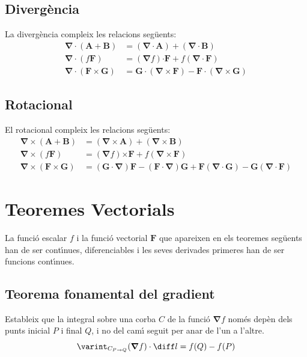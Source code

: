 \documentclass[catalan,a4paper,twoside,11pt]{article}
\begin{document}
\subsection{Diverg\`{e}ncia}
La diverg\`{e}ncia compleix les relacions seg\"{u}ents:
\begin{align}
    \boldsymbol{\nabla\cdot}(\boldsymbol{A}+\boldsymbol{B}) &= (\boldsymbol{\nabla\cdot A}) +
    (\boldsymbol{\nabla\cdot B})\\
    \boldsymbol{\nabla\cdot}(f\boldsymbol{F}) &=
    (\boldsymbol{\nabla}f)\boldsymbol{\cdot F} + f(\boldsymbol{\nabla\cdot F})\\
       \boldsymbol{\nabla\cdot}(\boldsymbol{F\times G}) &=
    \boldsymbol{G\cdot}(\boldsymbol{\nabla\times F}) -
    \boldsymbol{F\cdot}(\boldsymbol{\nabla\times G})
\end{align}

\subsection{Rotacional}
El rotacional compleix les relacions seg\"{u}ents:
\begin{align}
    \boldsymbol{\nabla\times}(\boldsymbol{A}+\boldsymbol{B}) &= (\boldsymbol{\nabla\times A}) + (\boldsymbol{\nabla\times B})\\
    \boldsymbol{\nabla\times}(f\boldsymbol{F}) &=
    (\boldsymbol{\nabla}f)\boldsymbol{\times F} + f(\boldsymbol{\nabla\times F})\\
    \boldsymbol{\nabla\times}(\boldsymbol{F\times G}) &= (\boldsymbol{G\cdot\nabla})\boldsymbol{F} - (\boldsymbol{F\cdot\nabla})\boldsymbol{G} + \boldsymbol{F}(\boldsymbol{\nabla\cdot G}) - \boldsymbol{G}(\boldsymbol{\nabla\cdot F})
\end{align}


\section{Teoremes Vectorials}

La funci\'{o} escalar $f$ i la funci\'{o} vectorial $\boldsymbol{F}$ que apareixen en els teoremes seg\"{u}ents han de ser cont\'{\i}nues, diferenciables i les seves derivades primeres han de ser funcions cont\'{\i}nues.

\subsection{Teorema fonamental del gradient}
Estableix que la integral sobre una corba $C$ de la funci\'{o} $\boldsymbol{\nabla} f$ nom\'{e}s dep\`{e}n dels punts inicial $P$ i final $Q$, i no del cam\'{\i} seguit per anar de l'un a l'altre.
\begin{equation}
    \varint_{C_{P\rightarrow Q}} (\boldsymbol{\nabla}f) \cdot \diff l = f(Q)-f(P)
\end{equation}
\end{document}
